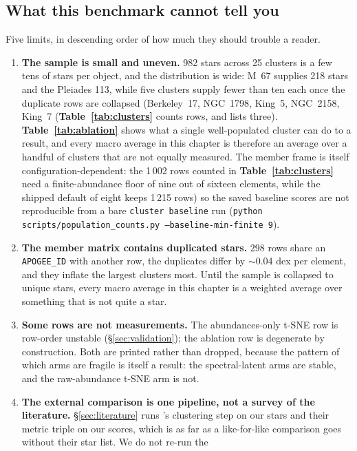 \subsection{What this benchmark cannot tell you}
\label{sec:limitations}

Five limits, in descending order of how much they should trouble a reader.

\begin{enumerate}
\item \textbf{The sample is small and uneven.} 982 stars across 25 clusters is
a few tens of stars per object, and the distribution is wide: M~67 supplies 218
stars and the Pleiades 113, while five clusters supply fewer than ten each once
the duplicate rows are collapsed (Berkeley~17, NGC~1798, King~5, NGC~2158,
King~7 (\textbf{Table~\ref{tab:clusters}} counts rows, and lists three).
\textbf{Table~\ref{tab:ablation}} shows what a single well-populated cluster
can do to a result, and every macro average in this chapter is therefore an
average over a handful of clusters that are not equally measured. The member
frame is itself configuration-dependent: the 1\,002 rows counted in
\textbf{Table~\ref{tab:clusters}} need a finite-abundance floor of nine out of
sixteen elements, while the shipped default of eight keeps 1\,215 rows) so the
saved baseline scores are not reproducible from a bare \texttt{cluster
baseline} run (\texttt{python scripts/population\_counts.py
--baseline-min-finite 9}).
\item \textbf{The member matrix contains duplicated stars.} 298 rows share an
  \texttt{APOGEE\_ID} with another row, the duplicates differ by
  $\sim\!0.04$ dex per element, and they inflate the largest clusters most.
  Until the sample is collapsed to unique stars, every macro average in this
  chapter is a weighted average over something that is not quite a
  star.
\item \textbf{Some rows are not measurements.} The abundances-only t-SNE row
  is row-order unstable (\S\ref{sec:validation}); the ablation row is
  degenerate by construction. Both are printed rather than dropped, because
  the pattern of which arms are fragile is itself a result: the
  spectral-latent arms are stable, and the raw-abundance t-SNE arm is not.
\item \textbf{The external comparison is one pipeline, not a survey of the
  literature.} \S\ref{sec:literature} runs \citet{Casamiquela:21}'s clustering
  step on our stars and their metric triple on our scores, which is as far as a
  like-for-like comparison goes without their star list. We do not re-run the

\end{enumerate}
